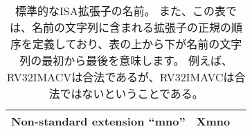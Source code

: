 \begin{table}[h]
\begin{tabular}{|l|c|c|}
\hline
Non-standard extension ``mno'' & Xmno & \\
\hline
\end{tabular}
\begin{comment}
\caption{Standard ISA extension names.  The table also defines the
  canonical order in which extension names must appear in the name
  string, with top-to-bottom in table indicating first-to-last in the
  name string, e.g., RV32IMACV is legal, whereas RV32IMAVC is not.}
\end{comment}
\caption{標準的なISA拡張子の名前。
  また、この表では、名前の文字列に含まれる拡張子の正規の順序を定義しており、表の上から下が名前の文字列の最初から最後を意味します。
  例えば、RV32IMACVは合法であるが、RV32IMAVCは合法ではないということである。}
\label{isanametable}
\end{table}
